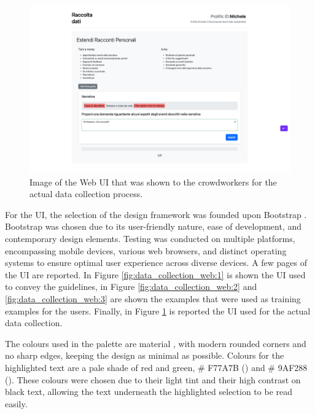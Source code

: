 \begin{figure}[!htbp]
    \centering
    \includegraphics[width=1\linewidth]{assets//imgs/UI-datacollection.png}
    \caption{Image of the Web UI that was shown to the crowdworkers for the actual data collection process.}
    \label{fig:data_collection_web:4}
\end{figure}

For the UI, the selection of the design framework was founded upon Bootstrap \cite{bootstrap}. Bootstrap was chosen due to its user-friendly nature, ease of development, and contemporary design elements. Testing was conducted on multiple platforms, encompassing mobile devices, various web browsers, and distinct operating systems to ensure optimal user experience across diverse devices.
A few pages of the UI are reported. In Figure \ref{fig:data_collection_web:1} is shown the UI used to convey the guidelines, in Figure \ref{fig:data_collection_web:2} and \ref{fig:data_collection_web:3} are shown the examples that were used as training examples for the users. Finally, in Figure \ref{fig:data_collection_web:4} is reported the UI used for the actual data collection.

The colours used in the palette are material \cite{material}, with modern rounded corners and no sharp edges, keeping the design as minimal as possible. Colours for the highlighted text are a pale shade of red and green, \# F77A7B (\redbg{\hspace{1em}}) and \# 9AF288 (\greenbg{\hspace{1em}}). These colours were chosen due to their light tint and their high contrast on black text, allowing the text underneath the highlighted selection to be read easily.


